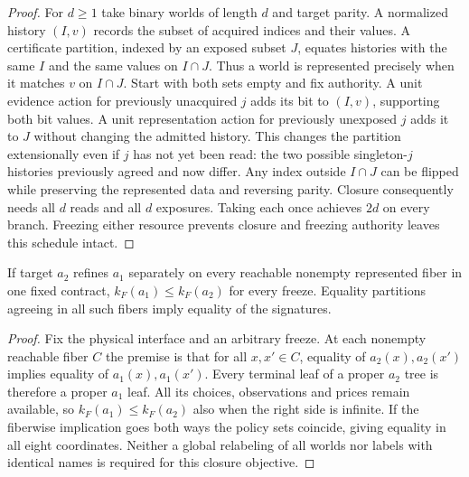 \begin{proof}

For \(d\ge1\) take binary worlds of length \(d\) and target parity. A normalized history \((I,v)\) records the subset of acquired indices and their values. A certificate partition, indexed by an exposed subset \(J\), equates histories with the same \(I\) and the same values on \(I\cap J\). Thus a world is represented precisely when it matches \(v\) on \(I\cap J\). Start with both sets empty and fix authority. A unit evidence action for previously unacquired \(j\) adds its bit to \((I,v)\), supporting both bit values. A unit representation action for previously unexposed \(j\) adds it to \(J\) without changing the admitted history. This changes the partition extensionally even if \(j\) has not yet been read: the two possible singleton-\(j\) histories previously agreed and now differ. Any index outside \(I\cap J\) can be flipped while preserving the represented data and reversing parity. Closure consequently needs all \(d\) reads and all \(d\) exposures. Taking each once achieves \(2d\) on every branch. Freezing either resource prevents closure and freezing authority leaves this schedule intact.

\end{proof}

\begin{proposition}\label{found:p07}

If target \(a_2\) refines \(a_1\) separately on every reachable nonempty represented fiber in one fixed contract, \(k_F(a_1)\le k_F(a_2)\) for every freeze. Equality partitions agreeing in all such fibers imply equality of the signatures.

\end{proposition}

\begin{proof}

Fix the physical interface and an arbitrary freeze. At each nonempty reachable fiber \(C\) the premise is that for all \(x,x'\in C\), equality of \(a_2(x),a_2(x')\) implies equality of \(a_1(x),a_1(x')\). Every terminal leaf of a proper \(a_2\) tree is therefore a proper \(a_1\) leaf. All its choices, observations and prices remain available, so \(k_F(a_1)\le k_F(a_2)\) also when the right side is infinite. If the fiberwise implication goes both ways the policy sets coincide, giving equality in all eight coordinates. Neither a global relabeling of all worlds nor labels with identical names is required for this closure objective.

\end{proof}
